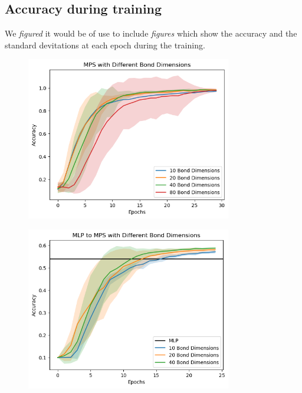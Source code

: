 \documentclass{article}
\theoremstyle{definition}
\theoremstyle{definition}
\begin{document}
\subsection{Accuracy during training}
We \emph{figured} it would be of use to include \emph{figures} which show the accuracy and the standard devitations at each epoch during the training.
\begin{figure}[H]
    \centering
    \caption{}
    \includegraphics[width=0.8\textwidth]{images/2023-04-21-18-13-34.png}
    \label{fig:MPS}
\end{figure}

\begin{figure}[H]
    \centering
    \caption{}
    \includegraphics[width=0.8\textwidth]{images/images/2023-04-21-18-13-34.png.png}
    \label{fig:MLP_to_MPS}
\end{figure}
\end{document}
